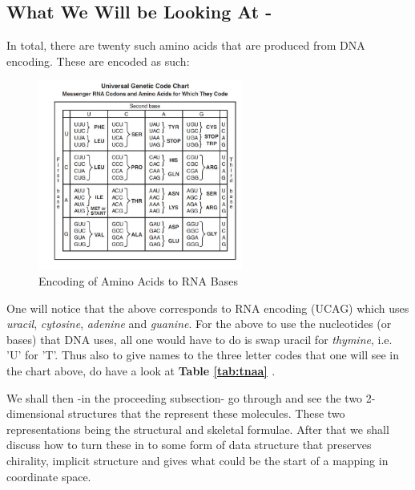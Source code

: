 \documentclass[a4paper,10pt]{article}
\begin{document}
\subsection{What We Will be Looking At -}
In total, there are twenty such amino acids that are produced from DNA encoding. These are encoded as such:
\begin{figure}[H]
\centering
\includegraphics[width=0.6\textwidth]{images/rna_ecode.png}
\caption{Encoding of Amino Acids to RNA Bases}
\label{fig:rna_chart}
\end{figure}
One will notice that the above corresponds to RNA encoding (UCAG) which uses \textit{uracil}, \textit{cytosine}, \textit{adenine} and \textit{guanine}. For the above to use the nucleotides (or bases) that DNA uses, all one would have to do is swap uracil for \textit{thymine}, i.e. 'U' for 'T'. Thus also to give names to the three letter codes that one will see in the chart above, do have a look at \textbf{Table \ref{tab:tnaa} \cite{chart}}.

We shall then -in the proceeding subsection- go through and see the two 2-dimensional structures that the represent these molecules. These two representations being the structural and skeletal formulae. After that we shall discuss how to turn these in to some form of data structure that preserves chirality, implicit structure and gives what could be the start of a mapping in coordinate space.
\end{document}
